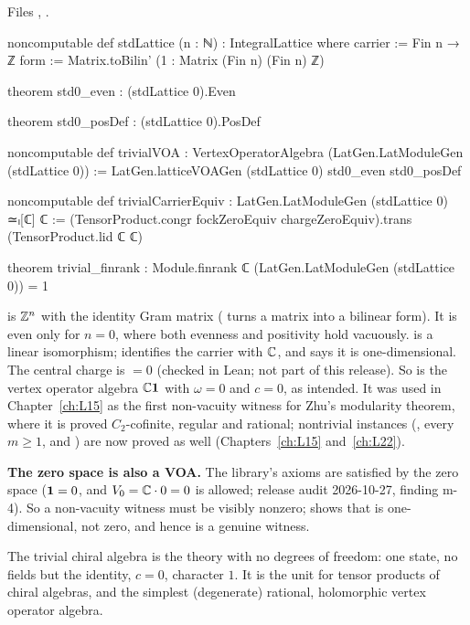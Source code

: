\noindent Files , .
\begin{leancode}
noncomputable def stdLattice (n : ℕ) : IntegralLattice where
  carrier := Fin n → ℤ
  form := Matrix.toBilin' (1 : Matrix (Fin n) (Fin n) ℤ)

theorem std0_even : (stdLattice 0).Even

theorem std0_posDef : (stdLattice 0).PosDef

noncomputable def trivialVOA : VertexOperatorAlgebra (LatGen.LatModuleGen (stdLattice 0)) :=
  LatGen.latticeVOAGen (stdLattice 0) std0_even std0_posDef

noncomputable def trivialCarrierEquiv : LatGen.LatModuleGen (stdLattice 0) ≃ₗ[ℂ] ℂ :=
  (TensorProduct.congr fockZeroEquiv chargeZeroEquiv).trans (TensorProduct.lid ℂ ℂ)

theorem trivial_finrank : Module.finrank ℂ (LatGen.LatModuleGen (stdLattice 0)) = 1
\end{leancode}

\begin{dictionary}
 is ${\mathbb{Z}}^n$ with the identity Gram matrix ( turns a matrix into a bilinear
form). It is even only for $n=0$, where both evenness and positivity hold vacuously.  is a linear
isomorphism;  identifies the carrier with ${\mathbb{C}}$, and  says it is
one-dimensional. The central charge is  $=0$ (checked in Lean; not part of this release). So  is the
vertex operator algebra ${\mathbb{C}}\mathbf{1}$ with $\omega=0$ and $c=0$, as intended. It was used in Chapter~\ref{ch:L15} as
the first non-vacuity witness for Zhu's modularity theorem, where it is proved $C_2$-cofinite, regular and rational;
nontrivial instances (, every $m\ge1$, and ) are now proved as well
(Chapters~\ref{ch:L15} and~\ref{ch:L22}).

\textbf{The zero space is also a VOA.} The library's axioms are satisfied by the zero space ($\mathbf{1} = 0$, and
$V_0 = {\mathbb{C}}\cdot0 = 0$ is allowed; release audit 2026-10-27, finding m-4). So a non-vacuity witness must be visibly
nonzero;  shows that  is one-dimensional, not zero, and hence is a genuine witness.
\end{dictionary}

\begin{physics}
The trivial chiral algebra is the theory with no degrees of freedom: one state, no fields but the identity,
$c=0$, character $1$. It is the unit for tensor products of chiral algebras, and the simplest (degenerate)
rational, holomorphic vertex operator algebra.
\end{physics}

